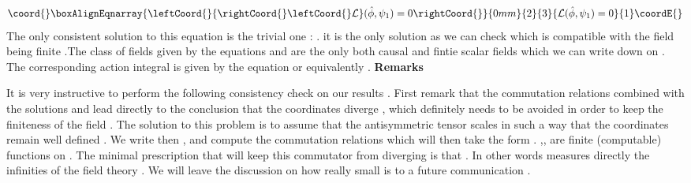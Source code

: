 \documentclass[a4paper,12pt]{article}
\begin{document}
\begin{eqnarray}\coord{}\boxAlignEqnarray{\leftCoord{}
{\rightCoord{}\leftCoord{}\cal
L}(\hat{\phi},{\psi}_1)=0
\rightCoord{}}{0mm}{2}{3}{
{\cal
L}(\hat{\phi},{\psi}_1)=0
}{1}\coordE{}\end{eqnarray}
The only consistent solution to this equation is the trivial one : \coordHE{} . it is the only solution as we can check which is compatible with the field \myHighlight{${\hat{\phi}}$}\coordHE{} being finite .The class of fields \myHighlight{${\hat{\phi}}$}\coordHE{} given by the equations \coordHE{}
and \coordHE{} are the only both causal and fintie scalar fields
which we can write down on \coordHE{} . The corresponding action
integral is given by the
equation \coordHE{} or equivalently
\coordHE{} .
\newpage
\vskip 5mm
\noindent
{\bf Remarks} \vskip 5mm
\noindent

It is very instructive to perform the following consistency check on our results . First remark that the commutation relations \coordHE{} combined with the solutions \coordHE{} and \coordHE{} lead directly to the conclusion that the coordinates \coordHE{} diverge , which definitely needs to be avoided in order to keep the finiteness of the field \myHighlight{$\hat{\phi}$}\coordHE{} . The solution to this problem is to assume that the antisymmetric tensor \myHighlight{${\theta}$}\coordHE{} scales in such a way that the coordinates \coordHE{} remain well defined . We write then \coordHE{} , and compute the commutation relations \coordHE{} which will then take the form \coordHE{} . \coordHE{},\coordHE{}, are finite (computable) functions on \coordHE{} . The minimal prescription that will keep this commutator from diverging is that \coordHE{} . In other words \myHighlight{${\theta}$}\coordHE{} measures directly the infinities of the field theory . We will leave the discussion on how really small is \myHighlight{${\theta}$}\coordHE{} to a future communication .
\end{document}
